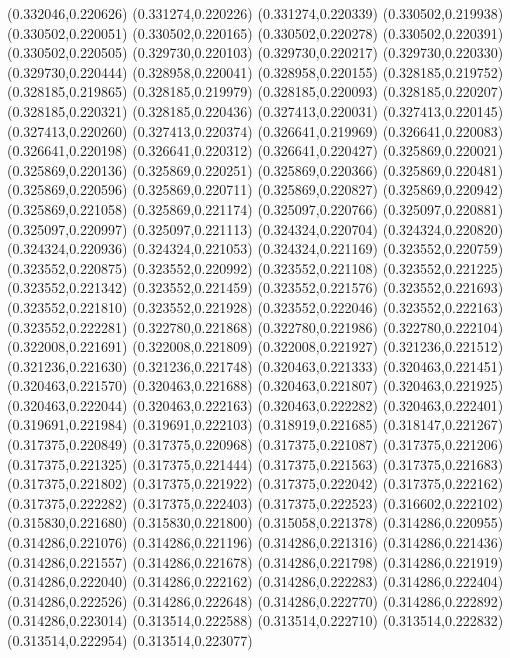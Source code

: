 (0.332046,0.220626)
(0.331274,0.220226)
(0.331274,0.220339)
(0.330502,0.219938)
(0.330502,0.220051)
(0.330502,0.220165)
(0.330502,0.220278)
(0.330502,0.220391)
(0.330502,0.220505)
(0.329730,0.220103)
(0.329730,0.220217)
(0.329730,0.220330)
(0.329730,0.220444)
(0.328958,0.220041)
(0.328958,0.220155)
(0.328185,0.219752)
(0.328185,0.219865)
(0.328185,0.219979)
(0.328185,0.220093)
(0.328185,0.220207)
(0.328185,0.220321)
(0.328185,0.220436)
(0.327413,0.220031)
(0.327413,0.220145)
(0.327413,0.220260)
(0.327413,0.220374)
(0.326641,0.219969)
(0.326641,0.220083)
(0.326641,0.220198)
(0.326641,0.220312)
(0.326641,0.220427)
(0.325869,0.220021)
(0.325869,0.220136)
(0.325869,0.220251)
(0.325869,0.220366)
(0.325869,0.220481)
(0.325869,0.220596)
(0.325869,0.220711)
(0.325869,0.220827)
(0.325869,0.220942)
(0.325869,0.221058)
(0.325869,0.221174)
(0.325097,0.220766)
(0.325097,0.220881)
(0.325097,0.220997)
(0.325097,0.221113)
(0.324324,0.220704)
(0.324324,0.220820)
(0.324324,0.220936)
(0.324324,0.221053)
(0.324324,0.221169)
(0.323552,0.220759)
(0.323552,0.220875)
(0.323552,0.220992)
(0.323552,0.221108)
(0.323552,0.221225)
(0.323552,0.221342)
(0.323552,0.221459)
(0.323552,0.221576)
(0.323552,0.221693)
(0.323552,0.221810)
(0.323552,0.221928)
(0.323552,0.222046)
(0.323552,0.222163)
(0.323552,0.222281)
(0.322780,0.221868)
(0.322780,0.221986)
(0.322780,0.222104)
(0.322008,0.221691)
(0.322008,0.221809)
(0.322008,0.221927)
(0.321236,0.221512)
(0.321236,0.221630)
(0.321236,0.221748)
(0.320463,0.221333)
(0.320463,0.221451)
(0.320463,0.221570)
(0.320463,0.221688)
(0.320463,0.221807)
(0.320463,0.221925)
(0.320463,0.222044)
(0.320463,0.222163)
(0.320463,0.222282)
(0.320463,0.222401)
(0.319691,0.221984)
(0.319691,0.222103)
(0.318919,0.221685)
(0.318147,0.221267)
(0.317375,0.220849)
(0.317375,0.220968)
(0.317375,0.221087)
(0.317375,0.221206)
(0.317375,0.221325)
(0.317375,0.221444)
(0.317375,0.221563)
(0.317375,0.221683)
(0.317375,0.221802)
(0.317375,0.221922)
(0.317375,0.222042)
(0.317375,0.222162)
(0.317375,0.222282)
(0.317375,0.222403)
(0.317375,0.222523)
(0.316602,0.222102)
(0.315830,0.221680)
(0.315830,0.221800)
(0.315058,0.221378)
(0.314286,0.220955)
(0.314286,0.221076)
(0.314286,0.221196)
(0.314286,0.221316)
(0.314286,0.221436)
(0.314286,0.221557)
(0.314286,0.221678)
(0.314286,0.221798)
(0.314286,0.221919)
(0.314286,0.222040)
(0.314286,0.222162)
(0.314286,0.222283)
(0.314286,0.222404)
(0.314286,0.222526)
(0.314286,0.222648)
(0.314286,0.222770)
(0.314286,0.222892)
(0.314286,0.223014)
(0.313514,0.222588)
(0.313514,0.222710)
(0.313514,0.222832)
(0.313514,0.222954)
(0.313514,0.223077)
